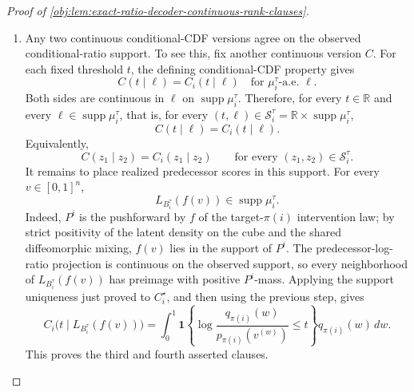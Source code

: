 \documentclass[11pt]{article}
\begin{document}
\begin{proof}[Proof of \cref{obj:lem:exact-ratio-decoder-continuous-rank-clauses}]
\begin{enumerate}
\item Any two continuous conditional-CDF versions agree on the observed conditional-ratio support.  To see this, fix another continuous version \(C\).  For each fixed threshold \(t\), the defining conditional-CDF property gives
\[
C(t\mid\ell)=C_i(t\mid\ell)
\quad\text{for }\mu_i^\tau\text{-a.e. }\ell .
\]
Both sides are continuous in \(\ell\) on \(\operatorname{supp}\mu_i^\tau\).  Therefore, for every \(t\in\mathbb R\) and every \(\ell\in\operatorname{supp}\mu_i^\tau\), that is, for every \((t,\ell)\in\mathcal S_i^\tau=\mathbb R\times\operatorname{supp}\mu_i^\tau\),
\[
C(t\mid\ell)=C_i(t\mid\ell).
\]
Equivalently,
\[
C(z_1\mid z_2)=C_i(z_1\mid z_2)
\qquad
\text{for every }(z_1,z_2)\in\mathcal S_i^\tau .
\]
It remains to place realized predecessor scores in this support.  For every \(v\in[0,1]^n\),
\[
L_{B_i^\tau}(f(v))
\in
\operatorname{supp}\mu_i^\tau .
\]
Indeed, \(P^i\) is the pushforward by \(f\) of the target-\(\pi(i)\) intervention law; by strict positivity of the latent density on the cube and the shared diffeomorphic mixing, \(f(v)\) lies in the support of \(P^i\).  The predecessor-log-ratio projection is continuous on the observed support, so every neighborhood of \(L_{B_i^\tau}(f(v))\) has preimage with positive \(P^i\)-mass.  Applying the support uniqueness just proved to \(C_i^\star\), and then using the previous step, gives
\[
C_i\bigl(t\mid L_{B_i^\tau}(f(v))\bigr)
=
\int_0^1
\mathbf 1\!\left\{
\log\frac{q_{\pi(i)}(w)}
{p_{\pi(i)}(v^{(w)})}\le t
\right\}
q_{\pi(i)}(w)\,dw .
\]
This proves the third and fourth asserted clauses. %


\end{enumerate}
\end{proof}
\end{document}
